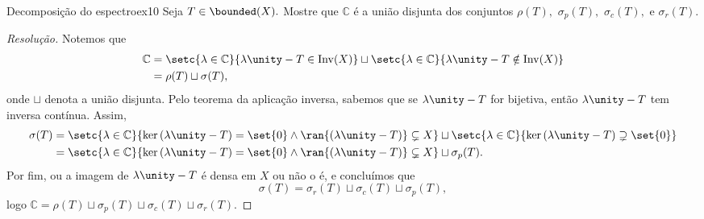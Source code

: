 \begin{exercício}{Decomposição do espectro}{ex10}
  Seja \(T \in \bounded(X).\) Mostre que \(\mathbb{C}\) é a união disjunta dos conjuntos \(\rho(T),\) \(\sigma_p(T),\) \(\sigma_c(T),\) e \(\sigma_r(T).\)
\end{exercício}
\begin{proof}[Resolução]
  Notemos que
  \begin{align*}
    \mathbb{C} &= \setc{\lambda \in \mathbb{C}}{\lambda \unity - T \in \mathrm{Inv}(X)} \sqcup \setc{\lambda \in \mathbb{C}}{\lambda \unity - T \notin \mathrm{Inv}(X)}\\
               &= \rho(T) \sqcup \sigma(T),
  \end{align*}
  onde \(\sqcup\) denota a união disjunta. Pelo teorema da aplicação inversa, sabemos que se \(\lambda \unity - T\) for bijetiva, então \(\lambda \unity - T\) tem inversa contínua. Assim,
  \begin{align*}
    \sigma(T) &= \setc{\lambda \in \mathbb{C}}{\ker{(\lambda \unity - T)} = \set{0}\land\ran{(\lambda \unity - T)} \subsetneq X} \sqcup \setc{\lambda \in \mathbb{C}}{\ker{(\lambda \unity - T)} \supsetneq \set{0}}\\
              &= \setc{\lambda \in \mathbb{C}}{\ker{(\lambda \unity - T)} = \set{0} \land \ran{(\lambda \unity - T)} \subsetneq X} \sqcup \sigma_p(T).
  \end{align*}
  Por fim, ou a imagem de \(\lambda \unity - T\) é densa em \(X\) ou não o é, e concluímos que
  \begin{equation*}
      \sigma(T) = \sigma_r(T) \sqcup \sigma_c(T) \sqcup \sigma_p(T),
  \end{equation*}
  logo \(\mathbb{C} = \rho(T) \sqcup \sigma_p(T) \sqcup \sigma_c(T) \sqcup \sigma_r(T).\)
\end{proof}
